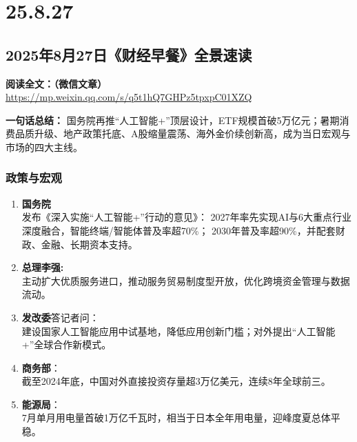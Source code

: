 \chapter{25.8.27}
\section{2025年8月27日《财经早餐》全景速读}
\vspace{1cm}
\noindent\textbf{阅读全文：（微信文章）} \url{https://mp.weixin.qq.com/s/q5t1hQ7GHPz5tpxpC01XZQ}

\textbf{一句话总结：}  
国务院再推“人工智能+”顶层设计，ETF规模首破5万亿元；暑期消费品质升级、地产政策托底、A股缩量震荡、海外金价续创新高，成为当日宏观与市场的四大主线。

\subsection{政策与宏观}
\begin{enumerate}[leftmargin=*, nosep]
    \item \textbf{国务院}\\
    发布《深入实施“人工智能+”行动的意见》：  
    2027年率先实现AI与6大重点行业深度融合，智能终端/智能体普及率超70\%；  
    2030年普及率超90\%，并配套财政、金融、长期资本支持。
    \item \textbf{总理李强:}\\  
    主动扩大优质服务进口，推动服务贸易制度型开放，优化跨境资金管理与数据流动。
    \item \textbf{发改委}答记者问：  \\
    建设国家人工智能应用中试基地，降低应用创新门槛；对外提出“人工智能+”全球合作新模式。
    \item \textbf{商务部}：  \\
    截至2024年底，中国对外直接投资存量超3万亿美元，连续8年全球前三。
    \item \textbf{能源局}：  \\
    7月单月用电量首破1万亿千瓦时，相当于日本全年用电量，迎峰度夏总体平稳。
\end{enumerate}

